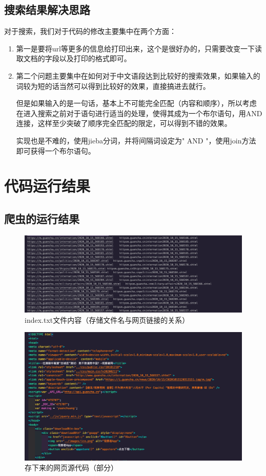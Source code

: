 \documentclass[UTF8]{ctexart}
\begin{document}
        \subsection{搜索结果解决思路}
            对于搜索，我们对于代码的修改主要集中在两个方面：
            \begin{enumerate}
                \item 第一是要将url等更多的信息给打印出来，这个是很好办的，只需要改变一下读取文档的字段以及打印的格式即可。
                \item 第二个问题主要集中在如何对于中文语段达到比较好的搜索效果，如果输入的词较为短的话当然可以得到比较好的效果，直接搞进去就行。\par
                但是如果输入的是一句话，基本上不可能完全匹配（内容和顺序），所以考虑在进入搜索之前对于语句进行适当的处理，使得其成为一个布尔语句，用AND连接，这样至少突破了顺序完全匹配的限定，可以得到不错的效果。\par
                实现也是不难的，使用jieba分词，并将间隔词设定为" AND "，使用join方法即可获得一个布尔语句。
            \end{enumerate}
    \section{代码运行结果}
        \subsection{爬虫的运行结果}
            \begin{figure}[ht]
                \centering
                \includegraphics[scale=0.25]{img/index.png}
                \caption{index.txt文件内容（存储文件名与网页链接的关系）}
            \end{figure} 
            \begin{figure}[ht]
                \centering
                \includegraphics[scale=0.25]{img/shtml.png}
                \caption{存下来的网页源代码（部分）}
            \end{figure}
\end{document}
